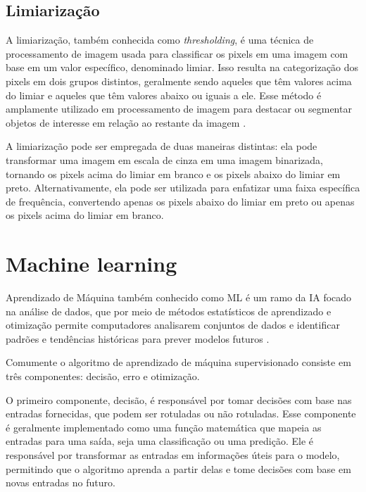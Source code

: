 \subsection[Limiarização]{Limiarização}

A limiarização, também conhecida como \textit{thresholding}, é uma técnica de processamento de imagem usada para classificar os pixels em uma imagem com base em um valor específico, denominado limiar. Isso resulta na categorização dos pixels em dois grupos distintos, geralmente sendo aqueles que têm valores acima do limiar e aqueles que têm valores abaixo ou iguais a ele. Esse método é amplamente utilizado em processamento de imagem para destacar ou segmentar objetos de interesse em relação ao restante da imagem \cite{limiarizacao}.

A limiarização pode ser empregada de duas maneiras distintas: ela pode transformar uma imagem em escala de cinza em uma imagem binarizada, tornando os pixels acima do limiar em branco e os pixels abaixo do limiar em preto. Alternativamente, ela pode ser utilizada para enfatizar uma faixa específica de frequência, convertendo apenas os pixels abaixo do limiar em preto ou apenas os pixels acima do limiar em branco\cite{opencv_thresholding}.


\section[Machine learning]{Machine learning}\label{sec:Machine learning}

Aprendizado de Máquina também conhecido como \ac{ML} é um ramo da \ac{IA} focado na análise de dados, que por meio de métodos estatísticos de aprendizado e otimização  permite computadores analisarem conjuntos de dados e identificar padrões e tendências históricas para prever modelos futuros \cite{ml}.

Comumente o algoritmo de aprendizado de máquina supervisionado consiste em três componentes: decisão, erro e otimização. 

O primeiro componente, decisão, é responsável por tomar decisões com base nas entradas fornecidas, que podem ser rotuladas ou não rotuladas. Esse componente é geralmente implementado como uma função matemática que mapeia as entradas para uma saída, seja uma classificação ou uma predição. Ele é responsável por transformar as entradas em informações úteis para o modelo, permitindo que o algoritmo aprenda a partir delas e tome decisões com base em novas entradas no futuro.

